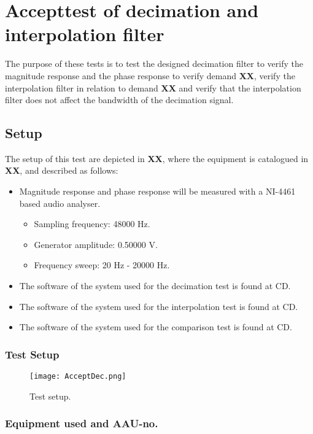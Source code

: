\chapter{Accepttest of decimation and interpolation filter}\label{app:journal_decimationFilter}
The purpose of these tests is to test the designed decimation filter to verify the magnitude response and the phase response to verify demand \textbf{XX}, verify the interpolation filter in relation to demand \textbf{XX} and verify that the interpolation filter does not affect the bandwidth of the decimation signal.

\section{Setup}
The setup of this test are depicted in \textbf{XX}, where the equipment is catalogued in \textbf{XX}, and described as follows:

\begin{itemize}
\item Magnitude response and phase response will be measured with a NI-4461 based audio analyser. 
\begin{itemize}
\item Sampling frequency: 48000 Hz.
\item Generator amplitude: 0.50000 V.
\item Frequency sweep: 20 Hz - 20000 Hz.
\end{itemize}
\item The software of the system used for the  decimation test is found at CD. 
\item The software of the system used for the  interpolation test is found at CD. 
\item The software of the system used for the  comparison test is found at CD. 
\end{itemize}


\subsection*{Test Setup}
\begin{figure}[H]
\centering
\texttt{[image: AcceptDec.png]}
\label{fig:AcceptDec}
\caption{Test setup.}
\end{figure}

\subsection*{Equipment used and AAU-no.}

